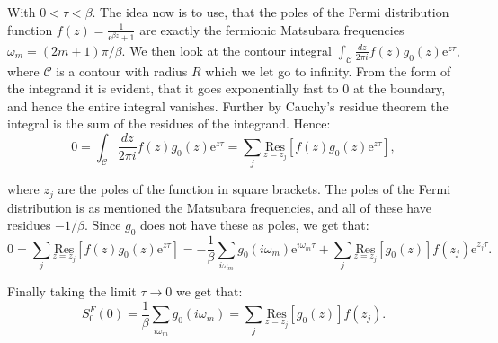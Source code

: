With $0<\tau<\beta$. The idea now is to use, that the poles of the Fermi distribution function $f(z) = \frac{1}{\text{e}^{\beta z}+1}$ are exactly the fermionic Matsubara frequencies $\omega_m = (2m+1)\pi /\beta$. We then look at the contour integral $ \int_\mathcal{C} \frac{dz}{2\pi i} f(z)g_0(z)\text{e}^{z\tau}$, where $\mathcal{C}$ is a contour with radius $R$ which we let go to infinity. From the form of the integrand it is evident, that it goes exponentially fast to 0 at the boundary, and hence the entire integral vanishes. Further by Cauchy's residue theorem the integral is the sum of the residues of the integrand. Hence:
\begin{equation}
0 = \int_\mathcal{C} \frac{dz}{2\pi i} f(z)g_0(z)\text{e}^{z\tau} = \sum_j \underset{z=z_j}{\text{Res}}[f(z)g_0(z)\text{e}^{z\tau}], \nonumber
\end{equation}

where $z_j$ are the poles of the function in square brackets. The poles of the Fermi distribution is as mentioned the Matsubara frequencies, and all of these have residues $-1/\beta$. Since $g_0$ does not have these as poles, we get that:
\begin{equation}
0 = \sum_j \underset{z=z_j}{\text{Res}}[f(z)g_0(z)\text{e}^{z\tau}] = -\frac{1}{\beta}\sum_{i\omega_m}g_0(i\omega_m)\text{e}^{i\omega_m\tau} + \sum_j \underset{z=z_j}{\text{Res}}[g_0(z)]f(z_j)\text{e}^{z_j\tau}. \nonumber
\end{equation}

Finally taking the limit $\tau \to 0$ we get that:
\begin{equation}
S^F_0(0)=\frac{1}{\beta}\sum_{i\omega_m}g_0(i\omega_m) = \sum_j \underset{z=z_j}{\text{Res}}[g_0(z)]f(z_j).
\label{eq.FermionMatsubaraSum}
\end{equation}




